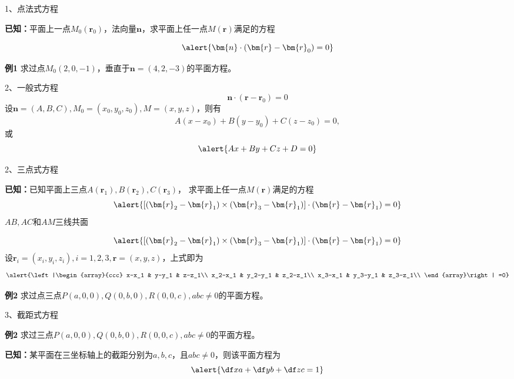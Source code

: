 \begin{frame}{1、点法式方程}
	\linespread{1.5}\pause 
	\pause 
	
	{\bf 已知：}平面上一点$M_0(\bm{r}_0)$，法向量$\bm{n}$，求平面上任一点$M(\bm{r})$满足的方程\pause 
	
	$$\alert{\bm{n}\cdot(\bm{r}-\bm{r}_0)=0}$$\pause 
	
	\vspace{-1em}
	\begin{exampleblock}{{\bf 例1}\hfill}
		求过点$M_0(2,0,-1)$，垂直于$\bm{n}=(4,2,-3)$的平面方程。
	\end{exampleblock}
\end{frame}

\begin{frame}{2、一般式方程}
	\linespread{1.5}\pause 
	$$\bm{n}\cdot(\bm{r}-\bm{r}_0)=0$$\pause 
	设$\bm{n}=(A,B,C),M_0=(x_0,y_0,z_0),M=(x,y,z)$，\pause 则有
	$$A(x-x_0)+B(y-y_0)+C(z-z_0)=0,$$
	或\pause 
	$$\alert{Ax+By+Cz+D=0}$$\pause 
\end{frame}

\begin{frame}{2、三点式方程}
	\linespread{1.5}\pause 
	\pause 
	
	{\bf 已知：}已知平面上三点$A(\bm{r}_1),B(\bm{r}_2),C(\bm{r}_3)$，
	求平面上任一点$M(\bm{r})$满足的方程\pause 
	$$\alert{[(\bm{r}_2-\bm{r}_1)\times(\bm{r}_3-\bm{r}_1)]\cdot(\bm{r}-\bm{r}_1)=0}$$\pause
	$AB,AC$和$AM$三线共面
\end{frame}

\begin{frame}
	\linespread{1.5}
	$$\alert{[(\bm{r}_2-\bm{r}_1)\times(\bm{r}_3-\bm{r}_1)]\cdot(\bm{r}-\bm{r}_1)=0}$$\pause
	设$\bm{r}_i=(x_i,y_i,z_i),i=1,2,3,\bm{r}=(x,y,z)$，\pause 上式即为
	$$\alert{\left|\begin{array}{ccc}
	x-x_1 & y-y_1 & z-z_1\\
	x_2-x_1 & y_2-y_1 & z_2-z_1\\
	x_3-x_1 & y_3-y_1 & z_3-z_1\\
	\end{array}\right|
	=0}
	$$\pause 
	\begin{exampleblock}{{\bf 例2}\hfill}
		求过点三点$P(a,0,0),Q(0,b,0),R(0,0,c),abc\ne0$的平面方程。
	\end{exampleblock}
\end{frame}

\begin{frame}{3、截距式方程}
	\linespread{1.5}
	\begin{exampleblock}{{\bf 例2}\hfill}
		求过三点$P(a,0,0),Q(0,b,0),R(0,0,c),abc\ne0$的平面方程。
	\end{exampleblock}\pause 
	{\bf 已知：}某平面在三坐标轴上的截距分别为$a,b,c$，且$abc\ne 0$，\pause 则该平面方程为
	$$\alert{\df xa+\df yb+\df zc=1}$$
\end{frame}

